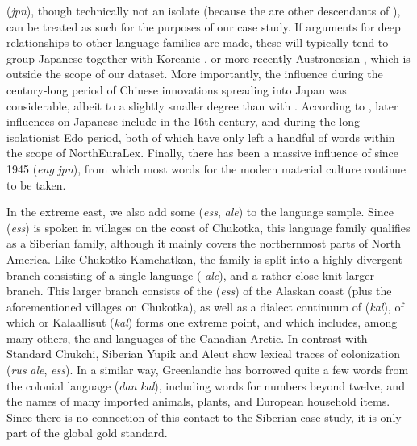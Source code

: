  (\textit{jpn}), though technically not an isolate (because the  are other descendants of ), can be treated as such for the purposes of our case study. If arguments for deep relationships to other language families are made, these will typically tend to group Japanese together with Koreanic \citep[e.g.][]{martin1966}, or more recently Austronesian \citep[e.g.][]{murayama1976}, which is outside the scope of our dataset. More importantly, the  influence during the century-long period of Chinese innovations spreading into Japan was considerable, albeit to a slightly smaller degree than with . According to \cite{schmidt2009}, later influences on Japanese include  in the 16th century, and  during the long isolationist Edo period, both of which have only left a handful of words within the scope of NorthEuraLex. Finally, there has been a massive influence of  since 1945 (\textit{eng} \arrowLA \textit{jpn}), from which most words for the modern material culture continue to be taken.

In the extreme east, we also add some  (\textit{ess}, \textit{ale}) to the language sample. Since  (\textit{ess}) is spoken in villages on the coast of Chukotka, this language family qualifies as a Siberian family, although it mainly covers the northernmost parts of North America. Like Chukotko-Kamchatkan, the family is split into a highly divergent branch consisting of a single language ( \textit{ale}), and a rather close-knit larger branch. This larger branch consists of the  (\textit{ess}) of the Alaskan coast (plus the aforementioned villages on Chukotka), as well as a dialect continuum of  (\textit{kal}), of which  or Kalaallisut (\textit{kal}) forms one extreme point, and which includes, among many others, the  and  languages of the Canadian Arctic. In contrast with Standard Chukchi, Siberian Yupik and Aleut show lexical traces of  colonization (\textit{rus} \arrowLA \textit{ale}, \textit{ess}). In a similar way, Greenlandic has borrowed quite a few words from the colonial language  (\textit{dan} \arrowLA \textit{kal}), including words for numbers beyond twelve, and the names of many imported animals, plants, and European household items. Since there is no connection of this contact to the Siberian case study, it is only part of the global gold standard.

